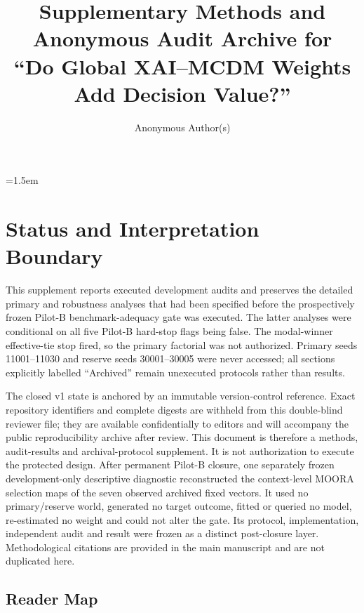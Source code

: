\documentclass[runningheads]{llncs}
\begin{document}
\emergencystretch=1.5em

\title{Supplementary Methods and Anonymous Audit Archive for\\
``Do Global XAI--MCDM Weights Add Decision Value?''}

\author{Anonymous Author(s)}

\maketitle

\section{Status and Interpretation Boundary}

This supplement reports executed development audits and preserves the detailed primary and
robustness analyses that had been specified before the prospectively frozen Pilot-B
benchmark-adequacy gate was executed. The latter analyses were conditional on all five Pilot-B
hard-stop flags being false. The modal-winner effective-tie stop fired, so the primary factorial
was not authorized. Primary seeds 11001--11030 and reserve seeds 30001--30005 were never
accessed; all sections explicitly labelled ``Archived'' remain unexecuted protocols rather than
results.

The closed v1 state is anchored by an immutable version-control reference. Exact repository
identifiers and complete digests are withheld from this double-blind reviewer file; they are
available confidentially to editors and will accompany the public reproducibility archive after
review.
This document is therefore a methods, audit-results and archival-protocol supplement. It is not
authorization to execute the protected design.
After permanent Pilot-B closure, one separately frozen development-only descriptive diagnostic
reconstructed the context-level MOORA selection maps of the seven observed archived fixed
vectors. It used no primary/reserve world, generated no target outcome, fitted or queried no
model, re-estimated no weight and could not alter the gate. Its protocol, implementation,
independent audit and result were frozen as a distinct post-closure layer.
Methodological citations are provided in the main manuscript and are not duplicated here.

\subsection*{Reader Map}
\end{document}
